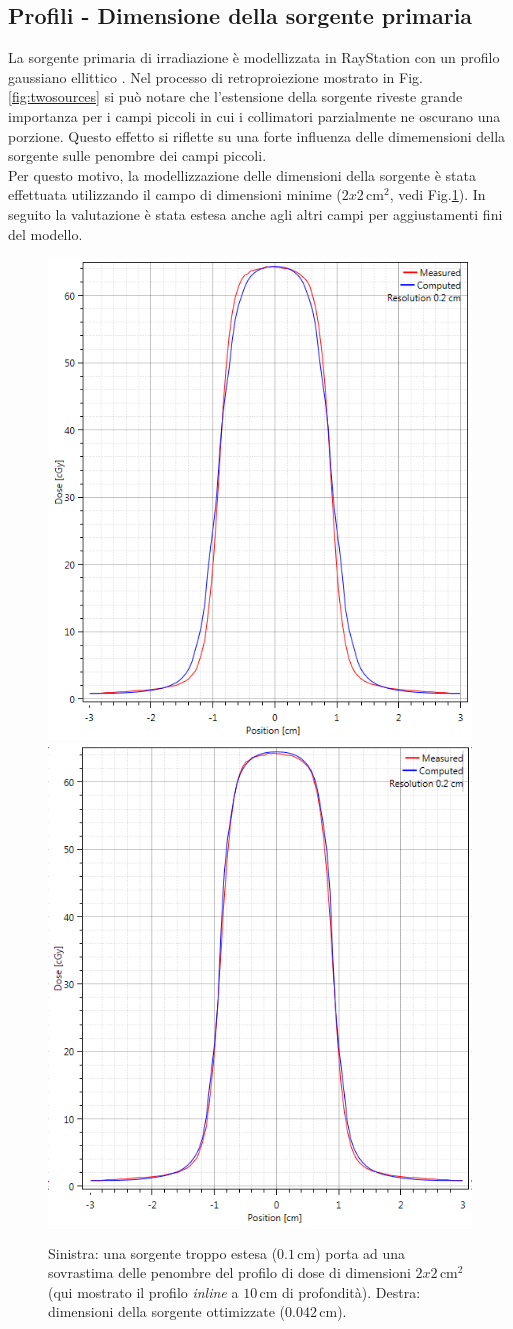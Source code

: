 \subsection{Profili - Dimensione della sorgente primaria}
La sorgente primaria di irradiazione è modellizzata in RayStation con un profilo gaussiano ellittico \cite{Chaney1994}. Nel processo di retroproiezione mostrato in Fig.\ref{fig:twosources} si può notare che l'estensione della sorgente riveste grande importanza per i campi piccoli in cui i collimatori parzialmente ne oscurano una porzione. Questo effetto si riflette su una forte influenza delle dimemensioni della sorgente sulle penombre dei campi piccoli.\\
Per questo motivo, la modellizzazione delle dimensioni della sorgente è stata effettuata utilizzando il campo di dimensioni minime ($2x2\,$cm$^2$, vedi Fig.\ref{fig:source_2x2}). In seguito la valutazione è stata estesa anche agli altri campi per aggiustamenti fini del modello.
\begin{figure}
\centering
\includegraphics[width=.48\textwidth]{./cap2/Ray_penumbra_wrong.PNG}
\includegraphics[width=.48\textwidth]{./cap2/Ray_penumbra_right.PNG}
\caption{Sinistra: una sorgente troppo estesa ($0.1\,$cm) porta ad una sovrastima delle penombre del profilo di dose di dimensioni $2x2\,$cm$^2$ (qui mostrato il profilo \textit{inline} a $10\,$cm di profondità). Destra: dimensioni della sorgente ottimizzate ($0.042\,$cm).}
\label{fig:source_2x2}
\end{figure}


